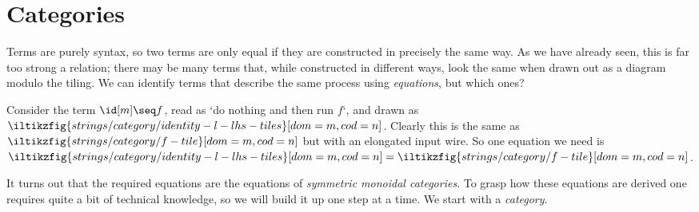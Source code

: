 \section{Categories}\label{sec:categories}

Terms are purely syntax, so two terms are only equal if they are constructed in
precisely the same way.
As we have already seen, this is far too strong a relation; there may be
many terms that, while constructed in different ways, look the same when drawn
out as a diagram modulo the tiling.
We can identify terms that describe the same process using \emph{equations}, but
which ones?

\begin{example}
    Consider the term \(\id[m] \seq f\), read as `do nothing and
    then run \(f\)`, and drawn as \(
    \iltikzfig{strings/category/identity-l-lhs-tiles}[dom=m,cod=n]
    \).
    Clearly this is the same as \(
    \iltikzfig{strings/category/f-tile}[dom=m,cod=n]
    \) but with an elongated input wire.
    So one equation we need is \(
    \iltikzfig{strings/category/identity-l-lhs-tiles}[dom=m,cod=n]
    =
    \iltikzfig{strings/category/f-tile}[dom=m,cod=n]
    \).
\end{example}

It turns out that the required equations are the equations of
\emph{symmetric monoidal categories}.
To grasp how these equations are derived one requires quite a
bit of technical knowledge, so we will build it up one step at a time.
We start with a \emph{category}.

